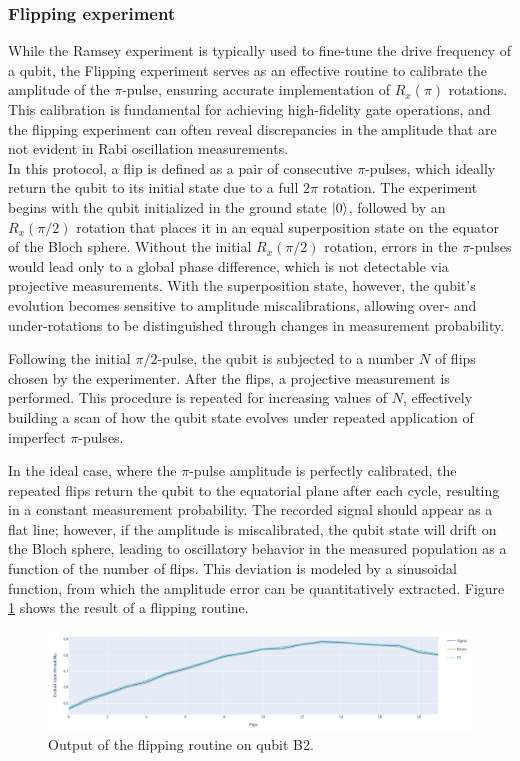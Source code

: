 \subsubsection{Flipping experiment}\label{subsec:Flipping}

While the Ramsey experiment is typically used to fine-tune the drive frequency of a qubit, the Flipping experiment serves as an effective routine to calibrate the amplitude of the $\pi$-pulse, ensuring accurate implementation of $R_x(\pi)$ rotations. 
This calibration is fundamental for achieving high-fidelity gate operations, and the flipping experiment can often reveal discrepancies in the amplitude that are not evident in Rabi oscillation measurements.\\
In this protocol, a flip is defined as a pair of consecutive $\pi$-pulses, which ideally return the qubit to its initial state due to a full $2\pi$ rotation. 
The experiment begins with the qubit initialized in the ground state $\ket{0}$, followed by an $R_x(\pi/2)$ rotation that places it in an equal superposition state on the equator of the Bloch sphere. 
Without the initial $R_x(\pi/2)$ rotation, errors in the $\pi$-pulses would lead only to a global phase difference, which is not detectable via projective measurements. 
With the superposition state, however, the qubit's evolution becomes sensitive to amplitude miscalibrations, allowing over- and under-rotations to be distinguished through changes in measurement probability.

Following the initial $\pi/2$-pulse, the qubit is subjected to a number $N$ of flips chosen by the experimenter. 
After the flips, a projective measurement is performed. This procedure is repeated for increasing values of $N$, effectively building a scan of how the qubit state evolves under repeated application of imperfect $\pi$-pulses.

In the ideal case, where the $\pi$-pulse amplitude is perfectly calibrated, the repeated flips return the qubit to the equatorial plane after each cycle, resulting in a constant measurement probability. 
The recorded signal should appear as a flat line; however, if the amplitude is miscalibrated, the qubit state will drift on the Bloch sphere, leading to oscillatory behavior in the measured population as a function of the number of flips. 
This deviation is modeled by a sinusoidal function, from which the amplitude error can be quantitatively extracted.
Figure \ref{fig:flipping} shows the result of a flipping routine.

\begin{figure}[h!]
    \centering
    \includegraphics[width=\textwidth]{figures/png/flipping.png}
    \caption{Output of the flipping routine on qubit B2.}
    \label{fig:flipping}
\end{figure}

